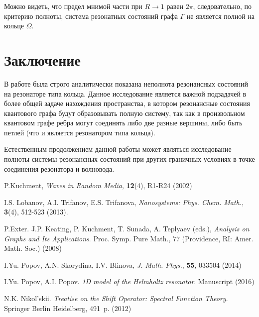 \documentclass{nsart_eng}
\begin{document}
Можно видеть, что предел мнимой части при $R \to 1$ равен $2 \pi$, следовательно, по критерию полноты, система резонатных состояний графа $\Gamma$ не является полной на кольце $\Omega$.


\section{Заключение}
В работе была строго аналитически показана неполнота резонансных состояний на резонаторе типа кольца. Данное исследование является важной подзадачей в более общей задаче нахождения пространства, в котором резонансные состояния квантового графа будут образовывать полную систему, так как в произвольном квантовом графе ребра могут соединять либо две разные вершины, либо быть петлей (что и является резонатором типа кольца).

Естественным продолжением данной работы может являться исследование полноты системы резонансных состояний при других граничных условиях в точке соединения резонатора и волновода.


\begin{thebibliography}{99}
 P.Kuchment, \textit{Waves in Random Media}, \textbf{12}(4), R1-R24 (2002)

 I.S. Lobanov, A.I. Trifanov, E.S. Trifanova, \textit{Nanosystems: Phys. Chem. Math.}, \textbf{3}(4), 512-523 (2013).

 P.Exter. J.P. Keating, P. Kuchment, T. Sunada, A. Teplyaev (eds.), \textit{Analysis on Graphs and Its Applications}. Proc. Symp. Pure Math., 77 (Providence, RI: Amer. Math. Soc.) (2008)

 I.Yu. Popov, A.N. Skorydina, I.V. Blinova, \textit{J. Math. Phys.}, \textbf{55}, 033504 (2014)

 I.Yu. Popov, A.I. Popov. {\it 1D model of the Helmholtz resonator}. Manuscript (2016)

 N.K. Nikol'skii. {\it Treatise on the Shift Operator: Spectral Function Theory}.  Springer Berlin Heidelberg,  491~p. (2012)





\end{thebibliography}
\end{document}
